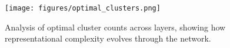 \begin{figure}[ht]
    \centering
    \texttt{[image: figures/optimal\_clusters.png]}
    \caption{Analysis of optimal cluster counts across layers, showing how representational complexity evolves through the network.}
    \label{fig:optimal_clusters}
\end{figure}